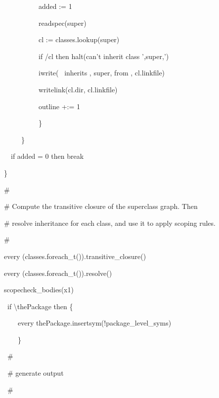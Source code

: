 {\ttfamily\mdseries
\ \ \ \ \ \ \ \ \ \ \ \ added := 1}

{\ttfamily\mdseries
\ \ \ \ \ \ \ \ \ \ \ \ readspec(super)}

{\ttfamily\mdseries
\ \ \ \ \ \ \ \ \ \ \ \ cl := classes.lookup(super)}

{\ttfamily\mdseries
\ \ \ \ \ \ \ \ \ \ \ \ if /cl then halt({\textquotedbl}can't inherit class
'{\textquotedbl},super,{\textquotedbl}'{\textquotedbl})}

{\ttfamily\mdseries
\ \ \ \ \ \ \ \ \ \ \ \ iwrite({\textquotedbl} \ inherits {\textquotedbl}, super, {\textquotedbl} from {\textquotedbl},
cl.linkfile)}

{\ttfamily\mdseries
\ \ \ \ \ \ \ \ \ \ \ \ writelink(cl.dir, cl.linkfile)}

{\ttfamily\mdseries
\ \ \ \ \ \ \ \ \ \ \ \ outline +:= 1}

{\ttfamily\mdseries
\ \ \ \ \ \ \ \ \ \ \ \ \}}

{\ttfamily\mdseries
\ \ \ \ \ \ \ \}}

{\ttfamily\mdseries
\ \ \ \ if added = 0 then break}

{\ttfamily\mdseries
\ \ \}}

{\ttfamily\mdseries
\ \ \#}

{\ttfamily\mdseries
\ \ \# Compute the transitive closure of the superclass graph. Then}

{\ttfamily\mdseries
\ \ \# resolve inheritance for each class, and use it to apply scoping rules.}

{\ttfamily\mdseries
\ \ \#}

{\ttfamily\mdseries
\ \ every (classes.foreach\_t()).transitive\_closure()}

{\ttfamily\mdseries
\ \ every (classes.foreach\_t()).resolve()}


\bigskip

{\ttfamily\mdseries
\ \ scopecheck\_bodies(x1)}


\bigskip

{\ttfamily\mdseries
\ \ \ if {\textbackslash}thePackage then \{}

{\ttfamily\mdseries
\ \ \ \ \ \ every thePackage.insertsym(!package\_level\_syms)}

{\ttfamily\mdseries
\ \ \ \ \ \ \}}


\bigskip

{\ttfamily\mdseries
\ \ \ \#}

{\ttfamily\mdseries
\ \ \ \# generate output}

{\ttfamily\mdseries
\ \ \ \#}


